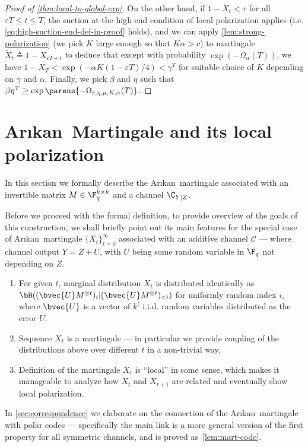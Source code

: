 \documentclass[11pt]{article}
\newcommand{\Arikan}{Ar\i kan}
\begin{document}
\begin{proof}[Proof of \cref{thm:local-to-global-exp}]
	On the other hand, if $1 - X_{t} < \tau$ for all $\varepsilon T \leq t \leq T$, the suction at the high end condition of local polarization applies (i.e. \cref{eq:high-suction-end-def-in-proof} holds), and we can apply \cref{lem:strong-polarization} (we pick $K$ large enough so that $K\alpha >c$) to martingale $\tilde{X}_t \triangleq 1 - X_{\varepsilon T + t}$ to deduce that except with probability $\exp(-\Omega_{\alpha}(T))$, we have $1 - X_T < \exp(-\alpha K (1-\varepsilon T) / 4) < \gamma^T$ for suitable choice of $K$ depending on $\gamma$ and $\alpha$. Finally, we pick $\beta$ and $\eta$ such that $\beta\eta^T\ge \exp\parens{-\Omega_{\varepsilon,\eta,\mu,K,\alpha}(T)}$.
\end{proof}


\section{\Arikan~Martingale and its local polarization}
\label{sec:martingale}


In this section we formally describe the \Arikan~martingale associated with an invertible matrix $M \in \F_q^{k \times k}$
and a channel $\C_{Y|Z}$. 


Before we proceed with the formal definition, to provide overview of the goals of this construction, we shall briefly point out its main features for the special case of \Arikan~martingale $\{X_t\}_{t=0}^{\infty}$ associated with an additive channel $\mathcal{C}$ --- where channel output $Y = Z + U$, with $U$ being some random variable in $\F_q$ not depending on $Z$.
\begin{enumerate}
\item
For given $t$, marginal distribution $X_t$ is distributed identically as $\bH( (\bvec{U} M^{\otimes t})_i | (\bvec{U} M^{\otimes t})_{<i})$ for uniformly random index $i$, where $\bvec{U}$ is a vector of $k^t$ i.i.d. random variables distributed as the error $U$.
\item
 Sequence $X_t$ is a martingale --- in particular we provide coupling of the distributions above over different $t$ in a non-trivial way.
\item
 Definition of the martingale $X_t$ is ``local'' in some sense, which makes it manageable to analyze how $X_t$ and $X_{t+1}$ are related and eventually show local polarization.
\end{enumerate}

In \cref{sec:correspondence} we elaborate on the connection of the \Arikan~martingale with polar codes --- specifically the main link is a more general version of the first property for all symmetric channels, and is proved as~\cref{lem:mart-code}.
\end{document}
